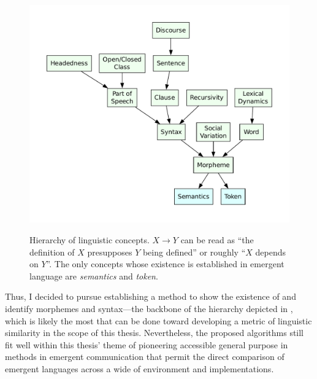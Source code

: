 \begin{figure}
  \centering
  \includegraphics[width=0.85\linewidth]{assets/linguistic-dag}
  \caption{%
    Hierarchy of linguistic concepts.
    $X\rightarrow Y$ can be read as ``the definition of $X$ presupposes $Y$ being defined'' or roughly ``$X$ depends on $Y$''.
    The only concepts whose existence is established in emergent language are \emph{semantics} and \emph{token}.}
  \unskip\label{fig:linguistic-dag}
\end{figure}

Thus, I decided to pursue establishing a method to show the existence of and identify morphemes and syntax---the backbone of the hierarchy depicted in , which is likely the most that can be done toward developing a metric of linguistic similarity in the scope of this thesis.
Nevertheless, the proposed algorithms still fit well within this thesis' theme of pioneering accessible general purpose in methods in emergent communication that permit the direct comparison of emergent languages across a wide of environment and implementations.
